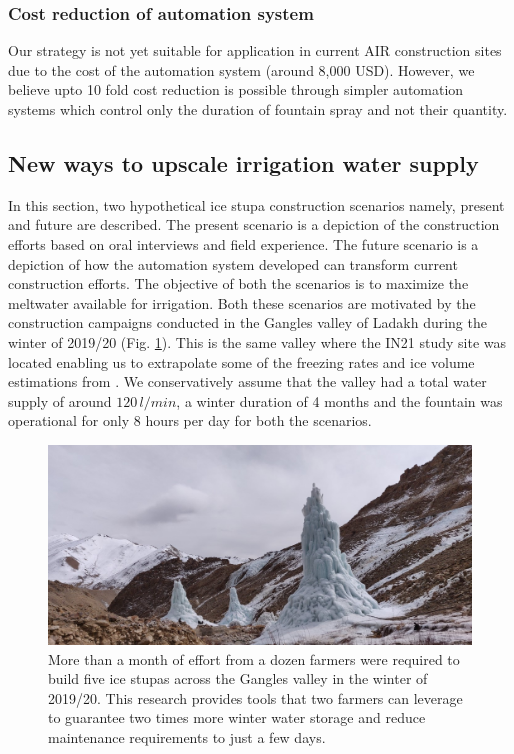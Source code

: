 \documentclass[tc, manuscript]{copernicus}
\begin{document}
\subsubsection{Cost reduction of automation system}

Our strategy is not yet suitable for application in current AIR construction sites due to the cost of the
automation system (around 8,000 USD). However, we believe upto 10 fold cost reduction is possible through
simpler automation systems which control only the duration of fountain spray and not their quantity. 

\subsection{New ways to upscale irrigation water supply}

In this section, two hypothetical ice stupa construction scenarios namely, present and future are described. The
present scenario is a depiction of the construction efforts based on oral interviews and field experience. The
future scenario is a depiction of how the automation system developed can transform current construction
efforts. The objective of both the scenarios is to maximize the meltwater available for irrigation. Both these
scenarios are motivated by the construction campaigns conducted in the Gangles valley of Ladakh during the
winter of 2019/20 (Fig. \ref{fig:icestupa_valley}). This is the same valley where the IN21 study site was
located enabling us to extrapolate some of the freezing rates and ice volume estimations from
\citet{balasubramanianInfluenceMeteorologicalConditions2022}. We conservatively assume that the valley had a
total water supply of around $120\,l/min$, a winter duration of 4 months and the fountain was operational for
only 8 hours per day for both the scenarios. 

\begin{figure}[htb]
	\includegraphics[width=\textwidth]{Figures/icestupa_valley}

  \caption{More than a month of effort from a dozen farmers were required to build five ice stupas across the
  Gangles valley in the winter of 2019/20. This research provides tools that two farmers can leverage to
  guarantee two times more winter water storage and reduce maintenance requirements to just a few days.}

	\label{fig:icestupa_valley}
\end{figure}
\end{document}

